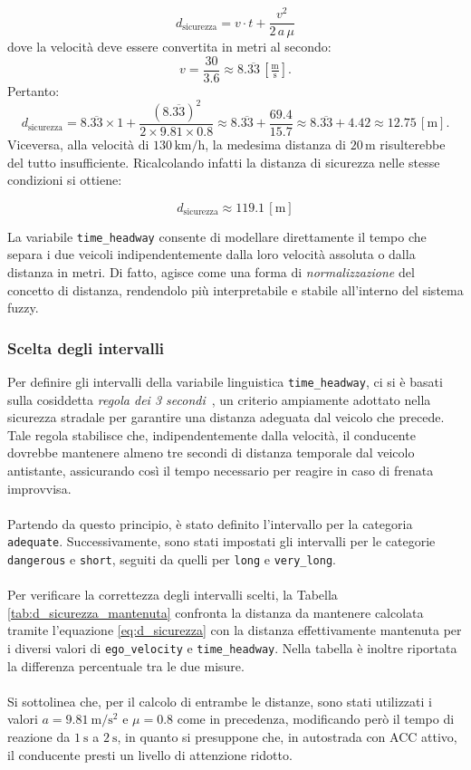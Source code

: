 \[
d_{\mathrm{sicurezza}} = v \cdot t + \frac{v^2}{2\,a\,\mu}
\]
dove la velocità deve essere convertita in metri al secondo:
\[
v = \frac{30}{3.6} \approx 8.\overline{33}\,\left[\tfrac{\mathrm{m}}{\mathrm{s}}\right].
\]
Pertanto:
\[
d_{\mathrm{sicurezza}} = 8.\overline{33} \times 1 + \frac{(8.\overline{33})^2}{2 \times 9.81 \times 0.8} \approx 8.\overline{33} + \frac{69.4}{15.7} \approx 8.\overline{33} + 4.42 \approx 12.75\,[\mathrm{m}].
\]
Viceversa, alla velocità di \(130\,\mathrm{km/h}\), la medesima distanza di \(20\,\mathrm{m}\) risulterebbe del tutto insufficiente. 
Ricalcolando infatti la distanza di sicurezza nelle stesse condizioni si ottiene:

\[
d_{\mathrm{sicurezza}} \approx 119.1\,[\mathrm{m}]
\]

\noindent La variabile \texttt{time\_headway} consente di modellare direttamente il tempo che separa i due veicoli 
indipendentemente dalla loro velocità assoluta o dalla distanza in metri. Di fatto, agisce come una forma di 
\emph{normalizzazione} del concetto di distanza, rendendolo più interpretabile e stabile all'interno del sistema fuzzy.

\subsubsection{Scelta degli intervalli} 
Per definire gli intervalli della variabile linguistica \texttt{time\_headway}, 
ci si è basati sulla cosiddetta \emph{regola dei 3 secondi}~\cite{benzinazero2016}, 
un criterio ampiamente adottato nella sicurezza stradale per garantire una distanza adeguata dal veicolo che precede. 
Tale regola stabilisce che, indipendentemente dalla velocità, il conducente dovrebbe mantenere almeno tre secondi di distanza 
temporale dal veicolo antistante, assicurando così il tempo necessario per reagire in caso di frenata improvvisa. 
\\\\
\noindent Partendo da questo principio, è stato definito l'intervallo per la categoria \texttt{adequate}. 
Successivamente, sono stati impostati gli intervalli per le categorie \texttt{dangerous} e \texttt{short}, 
seguiti da quelli per \texttt{long} e \texttt{very\_long}. 
\\\\
\noindent Per verificare la correttezza degli intervalli scelti, la Tabella \ref{tab:d_sicurezza_mantenuta} 
confronta la distanza da mantenere calcolata tramite l'equazione \ref{eq:d_sicurezza} con la distanza effettivamente mantenuta 
per i diversi valori di \texttt{ego\_velocity} e \texttt{time\_headway}. 
Nella tabella è inoltre riportata la differenza percentuale tra le due misure. 
\\\\
\noindent Si sottolinea che, per il calcolo di entrambe le distanze, sono stati utilizzati i valori $a = 9.81~\mathrm{m/s^2}$ 
e $\mu = 0.8$ come in precedenza, modificando però il tempo di reazione da $1~\mathrm{s}$ a $2~\mathrm{s}$, 
in quanto si presuppone che, in autostrada con ACC attivo, il conducente presti un livello di attenzione ridotto.


